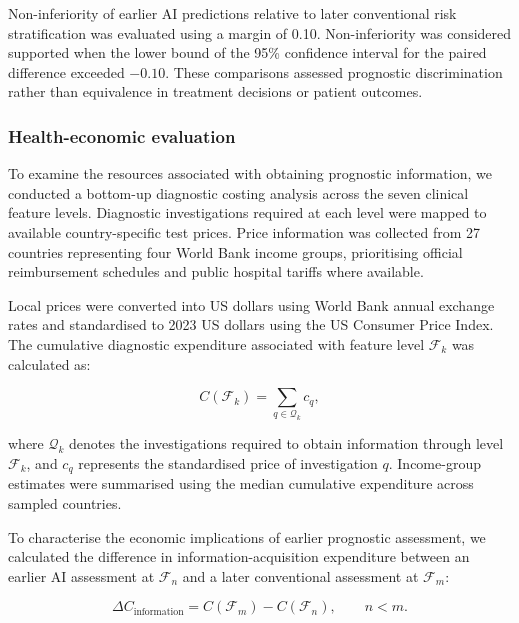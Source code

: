 \documentclass[pdflatex,sn-nature]{sn-jnl}
\begin{document}
Non-inferiority of earlier AI predictions relative to later conventional risk stratification was evaluated using a margin of 0.10. Non-inferiority was considered supported when the lower bound of the 95\% confidence interval for the paired difference exceeded $-0.10$. These comparisons assessed prognostic discrimination rather than equivalence in treatment decisions or patient outcomes.


\subsubsection{Health-economic evaluation}
\label{sec:economic_analysis}

To examine the resources associated with obtaining prognostic information, we conducted a bottom-up diagnostic costing analysis across the seven clinical feature levels. Diagnostic investigations required at each level were mapped to available country-specific test prices. Price information was collected from 27 countries representing four World Bank income groups, prioritising official reimbursement schedules and public hospital tariffs where available.

Local prices were converted into US dollars using World Bank annual exchange rates and standardised to 2023 US dollars using the US Consumer Price Index. The cumulative diagnostic expenditure associated with feature level $\mathcal{F}_k$ was calculated as:

\begin{equation}
C(\mathcal{F}_k)
=
\sum_{q\in\mathcal{Q}_k}c_q,
\label{eq:cumulative_cost}
\end{equation}

where $\mathcal{Q}_k$ denotes the investigations required to obtain information through level $\mathcal{F}_k$, and $c_q$ represents the standardised price of investigation $q$. Income-group estimates were summarised using the median cumulative expenditure across sampled countries.

To characterise the economic implications of earlier prognostic assessment, we calculated the difference in information-acquisition expenditure between an earlier AI assessment at $\mathcal{F}_n$ and a later conventional assessment at $\mathcal{F}_m$:

\begin{equation}
\Delta C_{\mathrm{information}}
=
C(\mathcal{F}_m)-C(\mathcal{F}_n),
\qquad n<m.
\label{eq:information_cost}
\end{equation}
\end{document}
